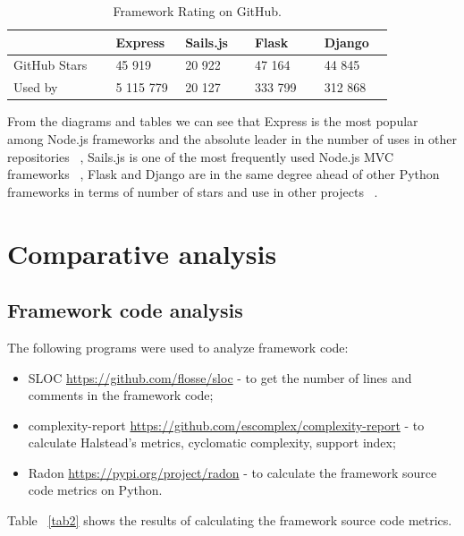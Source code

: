 \documentclass[runningheads]{llncs}
\begin{document}
\begin{table}
\caption{Framework Rating on GitHub.}\label{tab1}
\begin{tabular}{|p{0.25\linewidth}|p{0.175\linewidth}|p{0.175\linewidth}|p{0.175\linewidth}|p{0.175\linewidth}|}
\cline{2-5}
\multicolumn{1}{l|}{} & Express  & Sails.js  & Flask    & Django   \\ 
\hline
GitHub Stars        & 45 919    & 20 922     & 47 164  & 44 845  \\ 
\hline
Used by             & 5 115 779 & 20 127 & 333 799   & 312 868     \\
\hline
\end{tabular}
\end{table}
%

From the diagrams and tables we can see that Express is the most popular among Node.js frameworks and the absolute leader in the number of uses in other repositories ~\cite{ref_url1}, Sails.js is one of the most frequently used Node.js MVC frameworks ~\cite{ref_url2}, Flask and Django are in the same degree ahead of other Python frameworks in terms of number of stars and use in other projects ~\cite{ref_url3}.


\section{Comparative analysis}
\subsection{Framework code analysis}
The following programs were used to analyze framework code:
\begin{itemize}
	\item SLOC \url{https://github.com/flosse/sloc} - to get the number of lines and comments in the framework code;
	\item complexity-report \url{https://github.com/escomplex/complexity-report} - to calculate Halstead's metrics, cyclomatic complexity, support index;
	\item Radon \url{https://pypi.org/project/radon} - to calculate the framework source code metrics on Python. 
\end{itemize}

Table ~\ref{tab2} shows the results of calculating the framework source code metrics.
\end{document}
